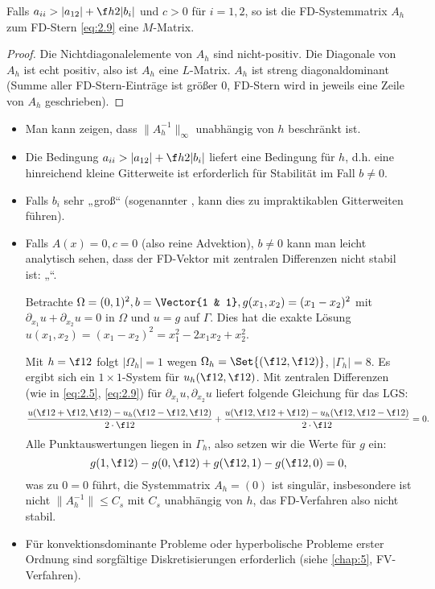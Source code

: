 
\begin{kor} \label{2.31}
	Falls $a_{ii} > |a_{12}| + \f h2 |b_i|$ und $c > 0$ für $i= 1,2$, so ist die FD-Systemmatrix $A_h$ zum FD-Stern \eqref{eq:2.9} eine $M$-Matrix.
	\begin{proof}
		Die Nichtdiagonalelemente von $A_h$ sind nicht-positiv.
		Die Diagonale von $A_h$ ist echt positiv, also ist $A_h$ eine $L$-Matrix.
		$A_h$ ist streng diagonaldominant (Summe aller FD-Stern-Einträge ist größer 0, FD-Stern wird in jeweils eine Zeile von $A_h$ geschrieben).
	\end{proof}
	\begin{note}
		\begin{itemize}
			\item
				Man kann zeigen, dass $\|A_h^{-1}\|_\infty$ unabhängig von $h$ beschränkt ist.
			\item
				Die Bedingung $a_{ii} > |a_{12}| + \f h2 |b_i|$ liefert eine Bedingung für $h$, d.h. eine hinreichend kleine Gitterweite ist erforderlich für Stabilität im Fall $b \neq 0$.
			\item
				Falls $b_i$ sehr „groß“ (sogenannter , kann dies zu impraktikablen Gitterweiten führen).
			\item
				Falls $A(x) = 0, c = 0$ (also reine Advektion), $b \neq 0$ kann man leicht analytisch sehen, dass der FD-Vektor mit zentralen Differenzen nicht stabil ist: „“.

				Betrachte $\Omega = (0,1)^2, b = \Vector{1 & 1}, g(x_1, x_2) = (x_1 - x_2)^2$ mit $\partial_{x_1} u + \partial_{x_2} u = 0$ in $\Omega$ und $u = g$ auf $\Gamma$.
				Dies hat die exakte Lösung $u(x_1, x_2) = (x_1 - x_2)^2 = x_1^2 - 2x_1x_2 + x_2^2$.

				Mit $h = \f 12$ folgt $|\Omega_h| = 1$ wegen $\Omega_h = \Set{(\f 12, \f 12)}$, $|\Gamma_h| = 8$.
				Es ergibt sich ein $1\times 1$-System für $u_h(\f 12, \f 12)$.
				Mit zentralen Differenzen (wie in \eqref{eq:2.5}, \eqref{eq:2.9}) für $\partial_{x_1} u, \partial_{x_2} u$ liefert folgende Gleichung für das LGS:
				\[
					\dfrac{u(\f 12 + \f 12, \f 12) - u_h(\f 12 - \f 12, \f 12)}{2 \cdot \f 12}
					+ \dfrac{u(\f 12, \f 12 + \f 12) - u_h(\f 12, \f 12 - \f 12)}{2 \cdot \f 12}
					= 0.
				\]
				Alle Punktauswertungen liegen in $\Gamma_h$, also setzen wir die Werte für $g$ ein:
				\[
					g(1, \f 12) - g(0, \f 12) + g(\f 12, 1) - g(\f 12, 0) = 0,
				\]
				was zu $0 = 0$ führt, die Systemmatrix $A_h = (0)$ ist singulär, insbesondere ist nicht $\|A_h^{-1}\| \le C_s$ mit $C_s$ unabhängig von $h$, das FD-Verfahren also nicht stabil.
			\item
				Für konvektionsdominante Probleme oder hyperbolische Probleme erster Ordnung sind sorgfältige Diskretisierungen erforderlich (siehe \ref{chap:5}, FV-Verfahren).
		\end{itemize}
	\end{note}
\end{kor}

